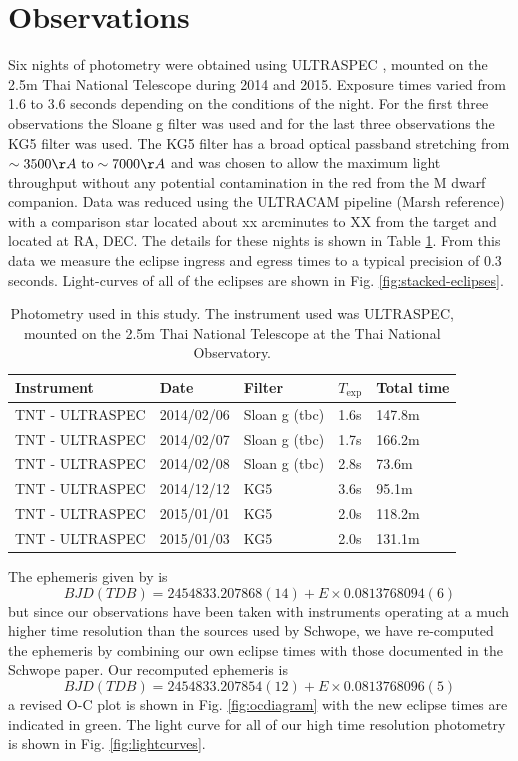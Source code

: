 \documentclass[a4paper,fleqn,usenatbib]{mnras}
\begin{document}
\section{Observations}
Six nights of photometry were obtained using ULTRASPEC \citep{ULTRASPEC}, mounted on the 2.5m Thai National Telescope during 2014 and 2015. Exposure times varied from 1.6 to 3.6 seconds depending on the conditions of the night. For the first three observations the Sloane g filter was used and for the last three observations the KG5 filter was used. The KG5 filter has a broad optical passband stretching from $\sim3500 \AA~ \mbox{to} \sim7000 \AA$ and was chosen to allow the maximum light throughput without any potential contamination in the red from the M dwarf companion.  Data was reduced using the ULTRACAM pipeline (Marsh reference) with a comparison star located about xx arcminutes to XX from the target and located at RA, DEC. The details for these nights is shown in Table \ref{tab:photometry}. From this data we measure the eclipse ingress and egress times to a typical precision of 0.3 seconds. Light-curves of all of the eclipses are shown in Fig. \ref{fig:stacked-eclipses}. 

\begin{table}
  \caption{Photometry used in this study. The instrument used was ULTRASPEC, mounted on the 2.5m Thai National Telescope at the Thai National Observatory.}
  \begin{tabular}{ l  l  l  l  l  }
  \hline
  Instrument & Date & Filter & $T_{\mbox{exp}}$& Total time \\
  \hline
    TNT - ULTRASPEC & 2014/02/06 & Sloan g (tbc)& 1.6s & 147.8m \\
    TNT - ULTRASPEC & 2014/02/07 & Sloan g (tbc)& 1.7s & 166.2m \\
    TNT - ULTRASPEC & 2014/02/08 & Sloan g (tbc)& 2.8s & 73.6m \\
    TNT - ULTRASPEC & 2014/12/12 & KG5 & 3.6s & 95.1m \\
    TNT - ULTRASPEC & 2015/01/01 & KG5 & 2.0s & 118.2m \\
    TNT - ULTRASPEC & 2015/01/03 & KG5 & 2.0s & 131.1m \\
    
  \hline
  \end{tabular}
  \label{tab:photometry}
\end{table}

The ephemeris given by \citet{Schwope2015} is 
\begin{equation}BJD(TDB) = 2454833.207868(14) + E\times0.0813768094(6)\end{equation}
but since our observations have been taken with instruments operating at a much higher time resolution than the sources used by Schwope, we have re-computed the ephemeris by combining our own eclipse times with those documented in the Schwope paper. Our recomputed ephemeris is 
\begin{equation}BJD(TDB) = 2454833.207854(12) + E\times0.0813768096(5)\end{equation}
a revised O-C plot is shown in Fig. \ref{fig:ocdiagram} with the new eclipse times are indicated in green. The light curve for all of our high time resolution photometry is shown in Fig. \ref{fig:lightcurves}.
\end{document}
